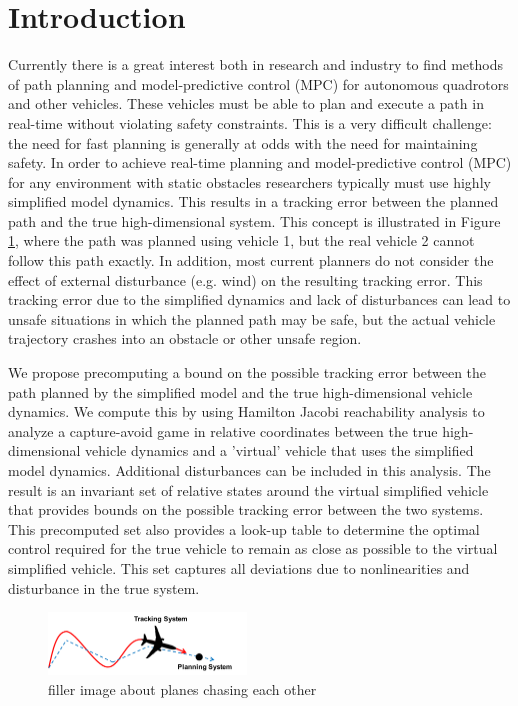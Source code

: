 \section{Introduction}
 Currently there is a great interest both in research and industry to find methods of path planning and model-predictive control (MPC) for autonomous quadrotors and other vehicles.  These vehicles must be able to plan and execute a path in real-time without violating safety constraints. This is a very difficult challenge: the need for fast planning is generally at odds with the need for maintaining safety. In order to achieve real-time planning and model-predictive control (MPC) for any environment with static obstacles researchers typically must use highly simplified model dynamics. This results in a tracking error between the planned path and the true high-dimensional system. This concept is illustrated in Figure \ref{fig:chasing}, where the path was planned using vehicle 1, but the real vehicle 2 cannot follow this path exactly. In addition, most current planners do not consider the effect of external disturbance (e.g. wind) on the resulting tracking error. This tracking error due to the simplified dynamics and lack of disturbances can lead to unsafe situations in which the planned path may be safe, but the actual vehicle trajectory crashes into an obstacle or other unsafe region.

We propose precomputing a bound on the possible tracking error between the path planned by the simplified model and the true high-dimensional vehicle dynamics. We compute this by using Hamilton Jacobi reachability analysis to analyze a capture-avoid game in relative coordinates between the true high-dimensional vehicle dynamics and a 'virtual' vehicle that uses the simplified model dynamics. Additional disturbances can be included in this analysis. The result is an invariant set of relative states around the virtual simplified vehicle that provides bounds on the possible tracking error between the two systems. This precomputed set also provides a look-up table to determine the optimal control required for the true vehicle to remain as close as possible to the virtual simplified vehicle. This set captures all deviations due to nonlinearities and disturbance in the true system.

\begin{figure}
	\centering
	\includegraphics[width=0.47\textwidth]{fig/chasing}
	\caption{filler image about planes chasing each other}
	\label{fig:chasing}
\end{figure}

